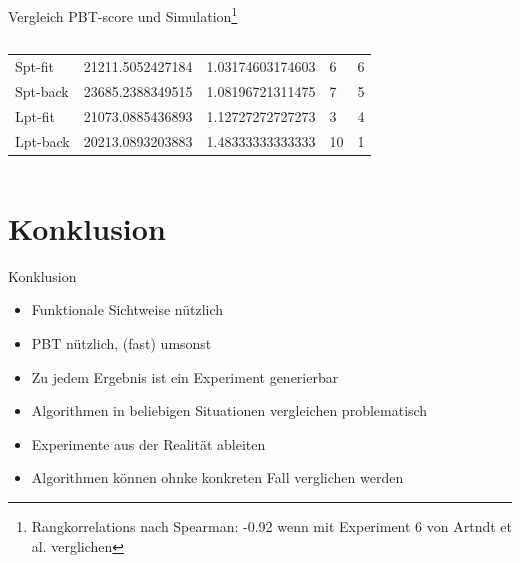 \documentclass[aspectratio=169,10pt]{beamer}
\begin{document}
\begin{frame}[t, fragile]{Vergleich PBT-score und Simulation\footnote{Rangkorrelations nach Spearman: -0.92 wenn mit Experiment 6 von Artndt et al. verglichen}}
\begin{columns}
\begin{column}[c]{0.5\paperwidth}
\begin{table}[]
{\begin{tabular}{lllll}
					Spt-fit                           & 21211.5052427184 & 1.03174603174603  & 6           & 6        \\
					Spt-back                          & 23685.2388349515 & 1.08196721311475  & 7           & 5        \\
					Lpt-fit                           & 21073.0885436893 & 1.12727272727273  & 3           & 4        \\
					Lpt-back                          & 20213.0893203883 & 1.48333333333333  & 10          & 1       \\ \hline
			\end{tabular}}
		\end{table}
	\end{column}
\end{columns}
\end{frame}

\section{Konklusion}
\begin{frame}[t,fragile]{Konklusion}
	\begin{itemize}[<+->]
		\item Funktionale Sichtweise n\"utzlich
		\item PBT n\"utzlich, (fast) umsonst
		\item Zu jedem Ergebnis ist ein Experiment generierbar
		\item Algorithmen in beliebigen Situationen vergleichen problematisch
		\item Experimente aus der Realit\"at ableiten
		\item Algorithmen k\"onnen ohnke konkreten Fall verglichen werden
	\end{itemize}
\end{frame}

\end{document}
